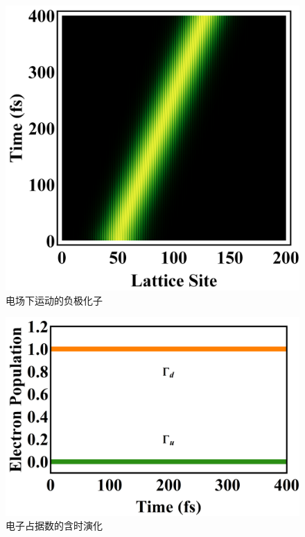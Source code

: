 \documentclass[12pt,]{report}
\begin{document}
\begin{figure}[h!]
    \centering
    \includegraphics[scale=0.5]{./figures/epolaron.png}
    \caption{电场下运动的负极化子}
    \label{fig:epolaron}
\end{figure}

\begin{figure}[h!]
    \centering
    \includegraphics[scale=0.5]{./figures/pop41.png}
    \caption{电子占据数的含时演化}
    \label{fig:pop41}
\end{figure}
\end{document}
